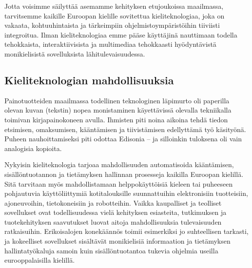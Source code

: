\begin{multicols}{2}

Jotta voisimme säilyttää asemamme kehityksen etujoukoissa maailmassa, tarvitsemme kaikille Euroopan kielille sovitettua kieliteknologiaa, joka on vakaata, kohtuuhintaista ja tärkeimpiin ohjelmistoympäristöihin tiiviisti integroitua. Ilman kieliteknologiaa emme pääse käyttäjinä nauttimaan todella tehokkaista, interaktiivisista ja multimediaa tehokkaasti hyödyntävistä monikielisistä sovelluksista lähitulevaisuudessa.

\subsection{Kieliteknologian mahdollisuuksia}

Painotuotteiden maailmassa todellinen teknologinen läpimurto oli paperilla olevan kuvan (tekstin) nopea monistaminen käyettävissä olevalla tekniikalla toimivan kirjapainokoneen avulla. Ihmisten piti noina aikoina tehdä tiedon etsimisen, omaksumisen, kääntämisen ja tiivistämisen edellyttämä työ käsityönä. Puheen nauhoittamiseksi piti odottaa Edisonia -- ja silloinkin tuloksena oli vain analogisia kopioita.

Nykyisin kieliteknologia tarjoaa mahdollisuuden automatisoida kääntämisen, sisällöntuotannon ja tietämyksen hallinnan prosesseja kaikilla Euroopan kielillä. Sitä tarvitaan myös mahdollistamaan helppokäyttöisiä kieleen tai puheeseen pohjautuvia käyttöliittymiä kotitalouksille suunnattuihin elektronisiin tuotteisiin, ajoneuvoihin, tietokoneisiin ja robotteihin. Vaikka kaupalliset ja teolliset sovellukset ovat todellisuudessa vielä kehityksen esiasteita, tutkimuksen ja tuotekehityksen saavutukset luovat aitoja mahdollisuuksia tulevaisuuden ratkaisuihin. Erikoisalojen konekäännös toimii esimerkiksi jo suhteellisen tarkasti, ja kokeelliset sovellukset sisältävät monikielisiä informaation ja tietämyksen hallintatyökaluja samoin kuin sisällöntuotantoa tukevia ohjelmia useilla eurooppalaisilla kielillä.



\end{multicols}
